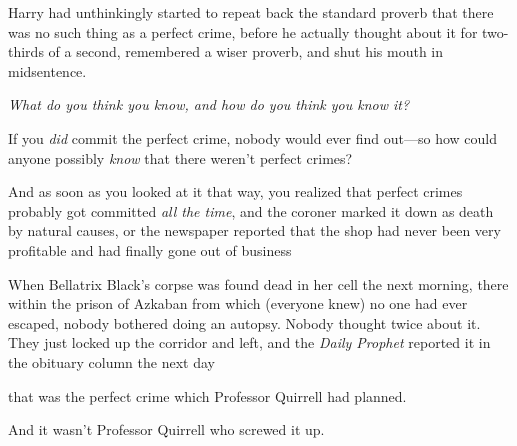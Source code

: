 Harry had unthinkingly started to repeat back the standard proverb that there
was no such thing as a perfect crime, before he actually thought about it for
two-thirds of a second, remembered a wiser proverb, and shut his mouth in
midsentence.

\emph{What do you think you know, and how do you think you know it?}

If you \emph{did} commit the perfect crime, nobody would ever find out---so how
could anyone possibly \emph{know} that there weren't perfect crimes?

And as soon as you looked at it that way, you realized that perfect crimes
probably got committed \emph{all the time}, and the coroner marked it down as
death by natural causes, or the newspaper reported that the shop had never been
very profitable and had finally gone out of business{\el}

When Bellatrix Black's corpse was found dead in her cell the next morning,
there within the prison of Azkaban from which (everyone knew) no one had ever
escaped, nobody bothered doing an autopsy. Nobody thought twice about it. They
just locked up the corridor and left, and the \emph{Daily Prophet} reported it
in the obituary column the next day{\el}

{\el} that was the perfect crime which Professor Quirrell had planned.

And it wasn't Professor Quirrell who screwed it up.
